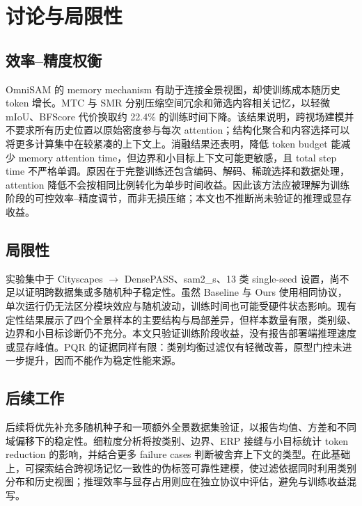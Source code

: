 \section{讨论与局限性}
\label{sec:discussion}

\subsection{效率--精度权衡}
OmniSAM 的 memory mechanism 有助于连接全景视图，却使训练成本随历史 token 增长。MTC 与 SMR 分别压缩空间冗余和筛选内容相关记忆，以轻微 mIoU、BFScore 代价换取约 22.4\% 的训练时间下降。该结果说明，跨视场建模并不要求所有历史位置以原始密度参与每次 attention；结构化聚合和内容选择可以将更多计算集中在较紧凑的上下文上。消融结果还表明，降低 token budget 能减少 memory attention time，但边界和小目标上下文可能更敏感，且 total step time 不严格单调。原因在于完整训练还包含编码、解码、稀疏选择和数据处理，attention 降低不会按相同比例转化为单步时间收益。因此该方法应被理解为训练阶段的可控效率--精度调节，而非无损压缩；本文也不推断尚未验证的推理或显存收益。

\subsection{局限性}
实验集中于 Cityscapes $\rightarrow$ DensePASS、sam2\_s、13 类 single-seed 设置，尚不足以证明跨数据集或多随机种子稳定性。虽然 Baseline 与 Ours 使用相同协议，单次运行仍无法区分模块效应与随机波动，训练时间也可能受硬件状态影响。现有定性结果展示了四个全景样本的主要结构与局部差异，但样本数量有限，类别级、边界和小目标诊断仍不充分。本文只验证训练阶段收益，没有报告部署端推理速度或显存峰值。PQR 的证据同样有限：类别均衡过滤仅有轻微改善，原型门控未进一步提升，因而不能作为稳定性能来源。

\subsection{后续工作}
后续将优先补充多随机种子和一项额外全景数据集验证，以报告均值、方差和不同域偏移下的稳定性。细粒度分析将按类别、边界、ERP 接缝与小目标统计 token reduction 的影响，并结合更多 failure cases 判断被舍弃上下文的类型。在此基础上，可探索结合跨视场记忆一致性的伪标签可靠性建模，使过滤依据同时利用类别分布和历史视图；推理效率与显存占用则应在独立协议中评估，避免与训练收益混写。
